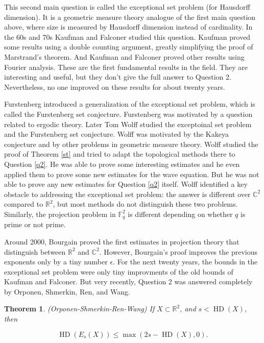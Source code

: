 \documentclass[12pt]{amsart}
\newtheorem{theorem}{Theorem}[section]
\newcommand{\FF}{\mathbb{F}}
\newcommand{\CC}{\mathbb{C}}
\newcommand{\RR}{\mathbb{R}}
\DeclareMathOperator{\HD}{HD}
\begin{document}
This second main question is called the exceptional set problem (for Hausdorff dimension).  It is a geometric measure theory analogue of the first main question above,  where size is measured by Hausdorff dimension instead of cardinality.   In the 60s and 70s Kaufman and Falconer studied this question.   Kaufman proved some results using a double counting argument,  greatly simplifying the proof of Marstrand's theorem.   And Kaufman and Falconer proved other results using Fourier analysis.   These are the first fundamental results in the field.   They are interesting and useful,  but they don't give the full answer to Question 2.  Nevertheless,  no one improved on these results for about twenty years.

Furstenberg introduced a generalization of the exceptional set problem,  which is called the Furstenberg set conjecture.   
Furstenberg was motivated by a question related to ergodic theory.   Later Tom Wolff studied the exceptoinal set problem and the Furstenberg set conjecture.  Wolff was motivated by the Kakeya conjecture and by other problems in geometric measure theory.   Wolff studied the proof of Theorem \ref{st} and tried to adapt the topological methods there to Question \ref{q2}.   He was able to prove some interesting estimates and he even applied them to prove some new estimates for the wave equation.  But he was not able to prove any new estimates for Question \ref{q2} itself.   Wolff identified a key obstacle to addressing the exceptional set problem: the answer is different over $\CC^2$ compared to $\RR^2$,  but most methods do not distinguish these two problems.   Similarly,  the projection problem in $\FF_q^2$ is different depending on whether $q$ is prime or not prime.

Around 2000,  Bourgain proved the first estimates in projection theory that distinguish between $\RR^2$ and $\CC^2$.   However,  Bourgain's proof improves the previous exponents only by a tiny number $\epsilon$.   For the next twenty years,  the bounds in the exceptional set problem were only tiny improvments of the old bounds of Kaufman and Falconer.    But very recently,  Question 2 was answered completely by Orponen,  Shmerkin,  Ren, and Wang.

\begin{theorem} \label{furst} (Orponen-Shmerkin-Ren-Wang) If $X \subset \RR^2$,  and $s < \HD(X)$,  then

$$ \HD(E_s(X)) \le \max( 2s - \HD(X), 0). $$

\end{theorem}
\end{document}
